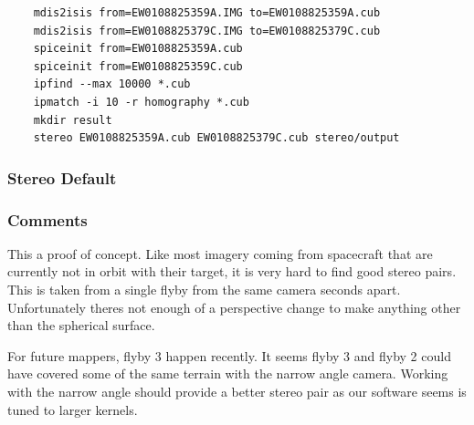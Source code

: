 \begin{verbatim}
    mdis2isis from=EW0108825359A.IMG to=EW0108825359A.cub
    mdis2isis from=EW0108825379C.IMG to=EW0108825379C.cub
    spiceinit from=EW0108825359A.cub
    spiceinit from=EW0108825359C.cub
    ipfind --max 10000 *.cub
    ipmatch -i 10 -r homography *.cub
    mkdir result
    stereo EW0108825359A.cub EW0108825379C.cub stereo/output
\end{verbatim}

\subsubsection*{Stereo Default}

\subsubsection*{Comments}

This a proof of concept. Like most imagery coming from spacecraft that
are currently not in orbit with their target, it is very hard to find
good stereo pairs. This is taken from a single flyby from the same
camera seconds apart. Unfortunately theres not enough of a perspective
change to make anything other than the spherical surface.

For future mappers, flyby 3 happen recently. It seems flyby 3 and
flyby 2 could have covered some of the same terrain with the narrow
angle camera. Working with the narrow angle should provide a better
stereo pair as our software seems is tuned to larger kernels.



